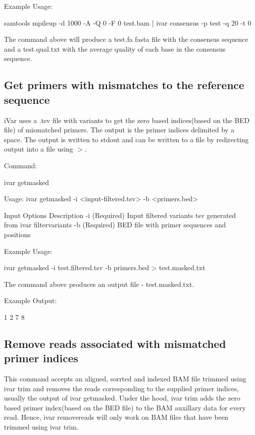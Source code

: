 Example Usage\+: 
\begin{DoxyCode}
samtools mpileup -d 1000 -A -Q 0 -F 0 test.bam | ivar consensus -p test -q 20 -t 0
\end{DoxyCode}


The command above will produce a test.\+fa fasta file with the consensus sequence and a test.\+qual.\+txt with the average quality of each base in the consensus sequence.\hypertarget{manualpage_autotoc_md8}{}\subsection{Get primers with mismatches to the reference sequence}\label{manualpage_autotoc_md8}
i\+Var uses a .tsv file with variants to get the zero based indices(based on the B\+E\+D file) of mismatched primers. The output is the primer indices delimited by a space. The output is written to stdout and can be written to a file by redirecting output into a file using {\ttfamily $>$}.

Command\+: 
\begin{DoxyCode}
ivar getmasked

Usage: ivar getmasked -i <input-filtered.tsv> -b <primers.bed>

Input Options    Description
           -i    (Required) Input filtered variants tsv generated from ivar filtervariants
           -b    (Required) BED file with primer sequences and positions
\end{DoxyCode}


Example Usage\+: 
\begin{DoxyCode}
ivar getmasked -i test.filtered.tsv -b primers.bed > test.masked.txt
\end{DoxyCode}


The command above produces an output file -\/ test.\+masked.\+txt.

Example Output\+: 
\begin{DoxyCode}
1 2 7 8
\end{DoxyCode}
\hypertarget{manualpage_autotoc_md9}{}\subsection{Remove reads associated with mismatched primer indices}\label{manualpage_autotoc_md9}
This command accepts an aligned, sorrted and indexed B\+AM file trimmed using {\ttfamily ivar trim} and removes the reads corresponding to the supplied primer indices, usually the output of {\ttfamily ivar getmasked}. Under the hood, {\ttfamily ivar trim} adds the zero based primer index(based on the B\+E\+D file) to the B\+AM auxillary data for every read. Hence, ivar removereads will only work on B\+AM files that have been trimmed using {\ttfamily ivar trim}.

